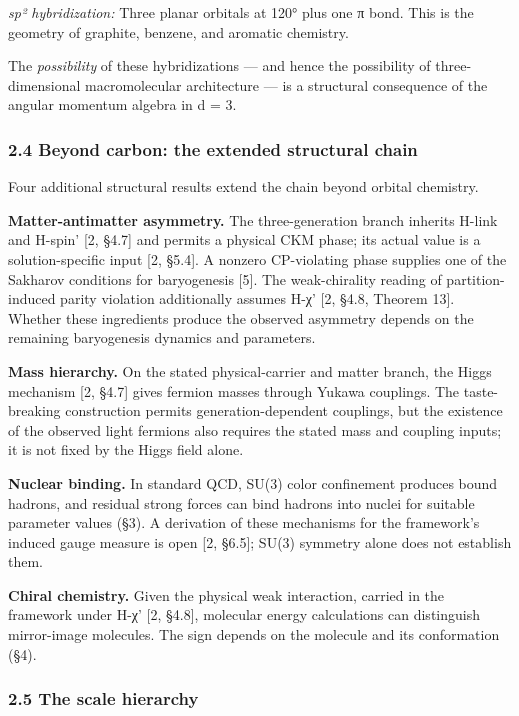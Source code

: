 \documentclass[
]{article}
\begin{document}
\emph{sp² hybridization:} Three planar orbitals at 120° plus one π bond.
This is the geometry of graphite, benzene, and aromatic chemistry.

The \emph{possibility} of these hybridizations --- and hence the
possibility of three-dimensional macromolecular architecture --- is a
structural consequence of the angular momentum algebra in d = 3.

\hypertarget{beyond-carbon-the-extended-structural-chain}{%
\subsubsection{2.4 Beyond carbon: the extended structural
chain}\label{beyond-carbon-the-extended-structural-chain}}

Four additional structural results extend the chain beyond orbital
chemistry.

\textbf{Matter-antimatter asymmetry.} The three-generation branch
inherits H-link and H-spin' {[}2, §4.7{]} and permits a physical CKM
phase; its actual value is a solution-specific input {[}2, §5.4{]}. A
nonzero CP-violating phase supplies one of the Sakharov conditions for
baryogenesis {[}5{]}. The weak-chirality reading of partition-induced
parity violation additionally assumes H-χ' {[}2, §4.8, Theorem 13{]}.
Whether these ingredients produce the observed asymmetry depends on the
remaining baryogenesis dynamics and parameters.

\textbf{Mass hierarchy.} On the stated physical-carrier and matter
branch, the Higgs mechanism {[}2, §4.7{]} gives fermion masses through
Yukawa couplings. The taste-breaking construction permits
generation-dependent couplings, but the existence of the observed light
fermions also requires the stated mass and coupling inputs; it is not
fixed by the Higgs field alone.

\textbf{Nuclear binding.} In standard QCD, SU(3) color confinement
produces bound hadrons, and residual strong forces can bind hadrons into
nuclei for suitable parameter values (§3). A derivation of these
mechanisms for the framework's induced gauge measure is open {[}2,
§6.5{]}; SU(3) symmetry alone does not establish them.

\textbf{Chiral chemistry.} Given the physical weak interaction, carried
in the framework under H-χ' {[}2, §4.8{]}, molecular energy calculations
can distinguish mirror-image molecules. The sign depends on the molecule
and its conformation (§4).

\hypertarget{the-scale-hierarchy}{%
\subsubsection{2.5 The scale hierarchy}\label{the-scale-hierarchy}}
\end{document}
